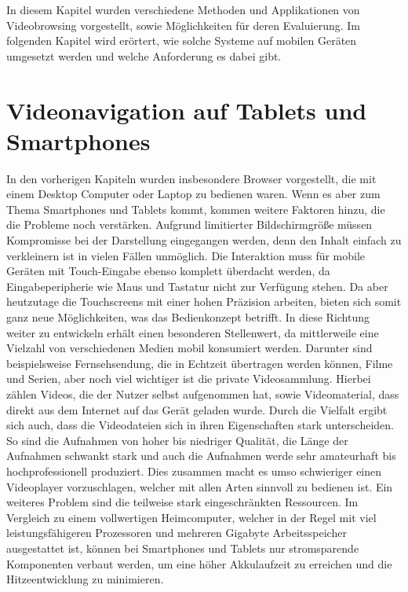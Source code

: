 \documentclass[11pt,a4paper]{report}
\begin{document}
In diesem Kapitel wurden verschiedene Methoden und Applikationen von Videobrowsing vorgestellt, sowie Möglichkeiten für deren Evaluierung. Im folgenden Kapitel wird erörtert, wie solche Systeme auf mobilen Geräten umgesetzt werden und welche Anforderung es dabei gibt.

\chapter{Videonavigation auf Tablets und Smartphones}

In den vorherigen Kapiteln wurden insbesondere Browser vorgestellt, die mit einem Desktop Computer oder Laptop zu bedienen waren. Wenn es aber zum Thema Smartphones und Tablets kommt, kommen weitere Faktoren hinzu, die die Probleme noch verstärken. Aufgrund limitierter Bildschirmgröße müssen Kompromisse bei der Darstellung eingegangen werden, denn den Inhalt einfach zu verkleinern ist in vielen Fällen unmöglich. Die Interaktion muss für mobile Geräten mit Touch-Eingabe ebenso komplett überdacht werden, da Eingabeperipherie wie Maus und Tastatur nicht zur Verfügung stehen. Da aber heutzutage die Touchscreens mit einer hohen Präzision arbeiten, bieten sich somit ganz neue Möglichkeiten, was das Bedienkonzept betrifft. In diese Richtung weiter zu entwickeln erhält einen besonderen Stellenwert, da mittlerweile eine Vielzahl von verschiedenen Medien mobil konsumiert werden. Darunter sind beispielsweise Fernsehsendung, die in Echtzeit übertragen werden können, Filme und Serien, aber noch viel wichtiger ist die private Videosammlung. Hierbei zählen Videos, die der Nutzer selbst aufgenommen hat, sowie Videomaterial, dass direkt aus dem Internet auf das Gerät geladen wurde. Durch die Vielfalt ergibt sich auch, dass die Videodateien sich in ihren Eigenschaften stark unterscheiden. So sind die Aufnahmen von hoher bis niedriger Qualität, die Länge der Aufnahmen schwankt stark und auch die Aufnahmen werde sehr amateurhaft bis hochprofessionell produziert. Dies zusammen macht es umso schwieriger einen Videoplayer vorzuschlagen, welcher mit allen Arten sinnvoll zu bedienen ist. Ein weiteres Problem sind die teilweise stark eingeschränkten Ressourcen. Im Vergleich zu einem vollwertigen Heimcomputer, welcher in der Regel mit viel leistungsfähigeren Prozessoren und mehreren Gigabyte Arbeitsspeicher ausgestattet ist, können bei Smartphones und Tablets nur stromsparende Komponenten verbaut werden, um eine höher Akkulaufzeit zu erreichen und die Hitzeentwicklung zu minimieren. \cite{hurst2007interactive}
\end{document}
